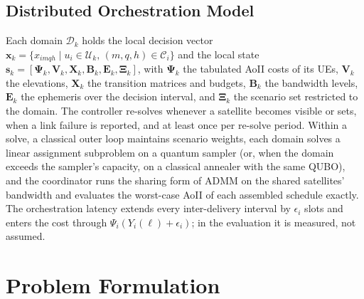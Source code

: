 \subsection{Distributed Orchestration Model}
\label{sec:orchestration}

Each domain $\mathcal{D}_k$ holds the local decision vector $\mathbf{x}_k=\{x_{imqh}\mid u_i\in\mathscr{U}_k,\,
(m,q,h)\in\mathscr{C}_i\}$ and the local state $\mathbf{s}_k=[\boldsymbol{\Psi}_k,\mathbf{V}_k,\mathbf{X}_k,
\mathbf{B}_k,\mathbf{E}_k,\boldsymbol{\Xi}_k]$, with $\boldsymbol{\Psi}_k$ the tabulated AoII costs of its UEs,
$\mathbf{V}_k$ the elevations, $\mathbf{X}_k$ the transition matrices and budgets, $\mathbf{B}_k$ the bandwidth levels,
$\mathbf{E}_k$ the ephemeris over the decision interval, and $\boldsymbol{\Xi}_k$ the scenario set restricted to the
domain. The controller re-solves whenever a satellite becomes visible or sets, when a link failure is reported, and
at least once per re-solve period. Within a solve, a classical outer loop maintains scenario weights, each domain
solves a linear assignment subproblem on a quantum sampler (or, when the domain exceeds the sampler's capacity, on a
classical annealer with the same QUBO), and the coordinator runs the sharing form of ADMM on the shared satellites'
bandwidth and evaluates the worst-case AoII of each assembled schedule exactly. The orchestration
latency extends every inter-delivery interval by $\epsilon_i$ slots and enters the cost through
$\Psi_i(Y_i(\ell)+\epsilon_i)$; in the evaluation it is measured, not assumed.

\section{Problem Formulation}
\label{sec:formulation}

